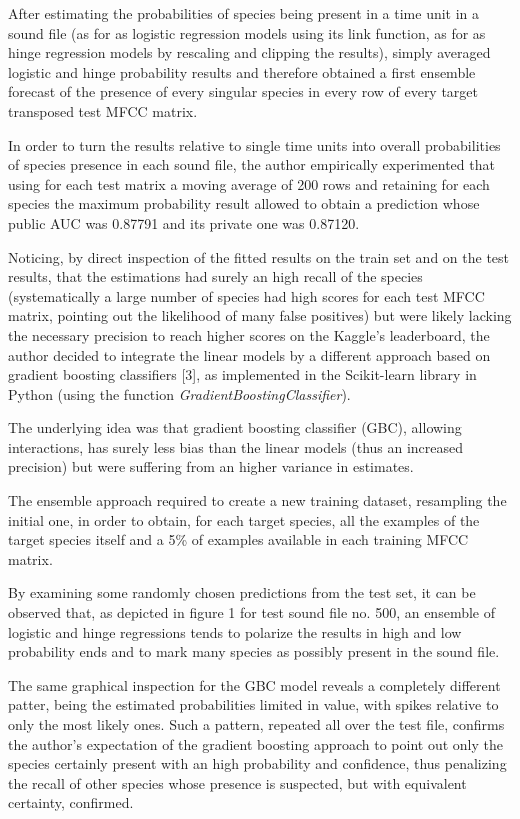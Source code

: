 After estimating the probabilities of species being present in a time unit in a
sound file (as for as logistic regression models using its link function, as for as hinge
regression models by rescaling and clipping the results), simply averaged logistic and hinge
probability results and therefore obtained a first ensemble forecast of the presence of every
singular species in every row of every target transposed test MFCC matrix.

In order to turn the results relative to single time units into overall probabilities of species
presence in each sound file, the author empirically experimented that using for each test
matrix a moving average of 200 rows and retaining for each species the maximum
probability result allowed to obtain a prediction whose public AUC was 0.87791 and its
private one was 0.87120.

Noticing, by direct inspection of the fitted results on the train set and on the test results, that
the estimations had surely an high recall of the species (systematically a large number of
species had high scores for each test MFCC matrix, pointing out the likelihood of many false
positives) but were likely lacking the necessary precision to reach higher scores on the
Kaggle’s leaderboard, the author decided to integrate the linear models by a different
approach based on gradient boosting classifiers [3], as implemented in the Scikit-learn
library in Python (using the function {\em GradientBoostingClassifier}).

The underlying idea was that gradient boosting classifier (GBC), allowing interactions, has
surely less bias than the linear models (thus an increased precision) but were suffering from
an higher variance in estimates.

The ensemble approach required to create a new training dataset, resampling the initial one,
in order to obtain, for each target species, all the examples of the target species itself and a
5\% of examples available in each training MFCC matrix.

By examining some randomly chosen predictions from the test set, it can be observed that, as
depicted in figure 1 for test sound file no. 500,
an ensemble of logistic and hinge
regressions tends to polarize the results in high and low probability ends and to mark many
species as possibly present in the sound file.

The same graphical inspection for the GBC model reveals a completely different patter,
being the estimated probabilities limited in value, with spikes relative to only the most likely
ones. Such a pattern, repeated all over the test file, confirms the author’s expectation of the
gradient boosting approach to point out only the species certainly present with an high
probability and confidence, thus penalizing the recall of other species whose presence is
suspected, but with equivalent certainty, confirmed.

